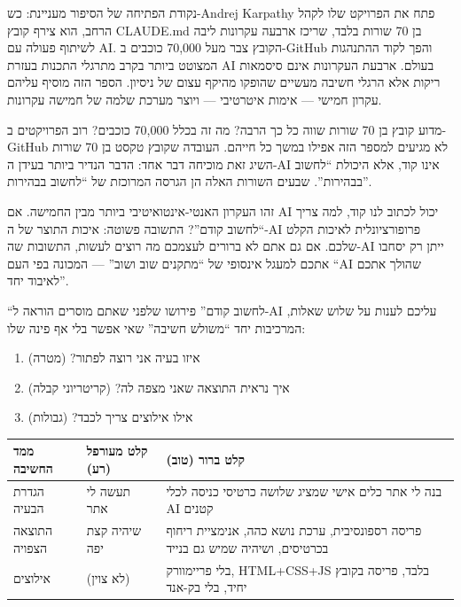 

נקודת הפתיחה של הסיפור מעניינת: כש-Andrej Karpathy פתח את הפרויקט שלו לקהל הרחב, הוא צירף קובץ CLAUDE.md בן 70 שורות בלבד, שריכז ארבעה עקרונות ליבה לשיתוף פעולה עם AI. הקובץ צבר מעל 70,000 כוכבים ב-GitHub והפך לקוד ההתנהגות המצוטט ביותר בקרב מתרגלי התכנות בעזרת AI בעולם. ארבעת העקרונות אינם סיסמאות ריקות אלא הרגלי חשיבה מעשיים שהופקו מהיקף עצום של ניסיון. הספר הזה מוסיף עליהם עקרון חמישי — אימות איטרטיבי — ויוצר מערכת שלמה של חמישה עקרונות.

\begin{tcbinfo}{מדוע קובץ בן 70 שורות שווה כל כך הרבה?}
מה זה בכלל 70,000 כוכבים? רוב הפרויקטים ב-GitHub לא מגיעים למספר הזה אפילו במשך כל חייהם. העובדה שקובץ טקסט בן 70 שורות השיג זאת מוכיחה דבר אחד: הדבר הנדיר ביותר בעידן ה-AI אינו קוד, אלא היכולת “לחשוב בבהירות”. שבעים השורות האלה הן הגרסה המרוכזת של “לחשוב בבהירות”.

\end{tcbinfo}


זהו העקרון האנטי-אינטואיטיבי ביותר מבין החמישה. אם AI יכול לכתוב לנו קוד, למה צריך “לחשוב קודם”? התשובה פשוטה: איכות התוצר של ה-AI פרופורציונלית לאיכות הקלט שלכם. אם גם אתם לא ברורים לעצמכם מה רוצים לעשות, התשובות שה-AI ייתן רק יסחבו אתכם למעגל אינסופי של “מתקנים שוב ושוב” — המכונה בפי העם “AI שהולך אתכם לאיבוד יחד”.

“לחשוב קודם” פירושו שלפני שאתם מוסרים הוראה ל-AI עליכם לענות על שלוש שאלות, המרכיבות יחד “משולש חשיבה” שאי אפשר בלי אף פינה שלו:

\begin{enumerate}
  \item איזו בעיה אני רוצה לפתור? (מטרה)
  \item איך נראית התוצאה שאני מצפה לה? (קריטריוני קבלה)
  \item אילו אילוצים צריך לכבד? (גבולות)
\end{enumerate}

\begin{center}
\begin{tabularx}{\linewidth}{|X|X|X|}
\hline
\textbf{ממד החשיבה} & \textbf{קלט מעורפל (רע)} & \textbf{קלט ברור (טוב)} \tabularnewline
\hline
הגדרת הבעיה & תעשה לי אתר & בנה לי אתר כלים אישי שמציג שלושה כרטיסי כניסה לכלי AI קטנים \tabularnewline
התוצאה הצפויה & שיהיה קצת יפה & פריסה רספונסיבית, ערכת נושא כהה, אנימציית ריחוף בכרטיסים, ושיהיה שמיש גם בנייד \tabularnewline
אילוצים & (לא צוין) & בלי פריימוורק, HTML+CSS+JS בלבד, פריסה בקובץ יחיד, בלי בק-אנד \tabularnewline
\hline
\end{tabularx}
\end{center}


